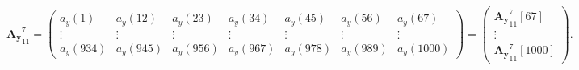 \begin{equation} \label{eq:etde2_exampleA2}
\boldsymbol{{A_y}}^{7}_{11}  = 
\begin{pmatrix}
  	a_y(1) & a_y(12) & a_y(23) & a_y(34) & a_y(45) & a_y(56) &  a_y(67) \\ 
	\vdots & \vdots & \vdots & \vdots & \vdots & \vdots & \vdots \\
  	a_y(934) & a_y(945) & a_y(956) &  a_y(967) &  a_y(978) &  a_y(989) & a_y(1000) 
\end{pmatrix}=
\begin{pmatrix}
\boldsymbol{{A_y}}^{7}_{11}[67] \\
\vdots \\
\boldsymbol{{A_y}}^{7}_{11}[1000] 
\end{pmatrix}.
\end{equation}





